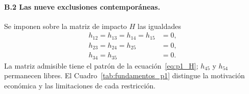 \documentclass[12pt,letterpaper]{article}
\renewcommand{\arraystretch}{1.05}
\begin{document}
\paragraph{B.2 Las nueve exclusiones contemporáneas.}
Se imponen sobre la matriz de impacto $H$ las igualdades
\begin{align}
h_{12}=h_{13}=h_{14}=h_{15}&=0,\nonumber\\
h_{23}=h_{24}=h_{25}&=0,\nonumber\\
h_{34}=h_{35}&=0.
\label{eq:b_ceros}
\end{align}
La matriz admisible tiene el patrón de la ecuación~\eqref{eq:p1_H}; $h_{45}$ y $h_{54}$ permanecen libres. El Cuadro~\ref{tab:fundamentos_p1} distingue la motivación económica y las limitaciones de cada restricción.

\begingroup
\footnotesize
\setlength{\tabcolsep}{2.5pt}
\renewcommand{\arraystretch}{1.16}
\end{document}
